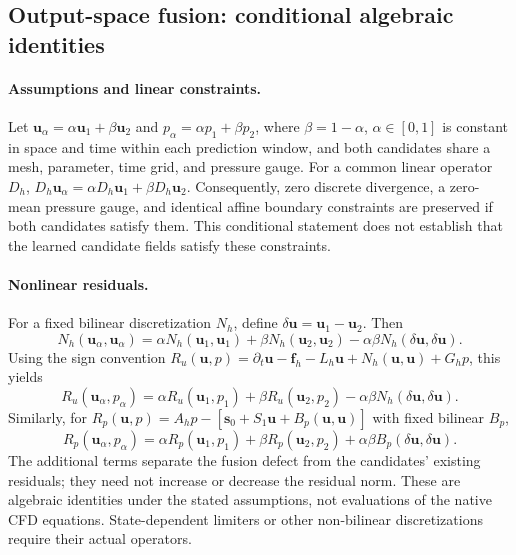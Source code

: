 
\subsection{Output-space fusion: conditional algebraic identities}
\label{app:fusion_consistency}

\paragraph{Assumptions and linear constraints.}
Let $\bm u_\alpha=\alpha\bm u_1+\beta\bm u_2$ and
$p_\alpha=\alpha p_1+\beta p_2$, where $\beta=1-\alpha$,
$\alpha\in[0,1]$ is constant in space and time within each prediction
window, and both candidates share a mesh, parameter, time grid, and
pressure gauge. For a common linear operator $D_h$,
$D_h\bm u_\alpha=\alpha D_h\bm u_1+\beta D_h\bm u_2$.
Consequently, zero discrete divergence, a zero-mean pressure gauge,
and identical affine boundary constraints are preserved if both
candidates satisfy them. This conditional statement does not establish
that the learned candidate fields satisfy these constraints.

\paragraph{Nonlinear residuals.}
For a fixed bilinear discretization $N_h$, define
$\delta\bm u=\bm u_1-\bm u_2$. Then
\begin{equation}
N_h(\bm u_\alpha,\bm u_\alpha)
=\alpha N_h(\bm u_1,\bm u_1)+\beta N_h(\bm u_2,\bm u_2)
-\alpha\beta N_h(\delta\bm u,\delta\bm u).
\end{equation}
Using the sign convention
$R_u(\bm u,p)=\partial_t\bm u-\bm f_h-L_h\bm u
+N_h(\bm u,\bm u)+G_hp$, this yields
\begin{equation}
R_u(\bm u_\alpha,p_\alpha)
=\alpha R_u(\bm u_1,p_1)+\beta R_u(\bm u_2,p_2)
-\alpha\beta N_h(\delta\bm u,\delta\bm u).
\end{equation}
Similarly, for
$R_p(\bm u,p)=A_hp-[\bm s_0+S_1\bm u+B_p(\bm u,\bm u)]$
with fixed bilinear $B_p$,
\begin{equation}
R_p(\bm u_\alpha,p_\alpha)
=\alpha R_p(\bm u_1,p_1)+\beta R_p(\bm u_2,p_2)
+\alpha\beta B_p(\delta\bm u,\delta\bm u).
\end{equation}
The additional terms separate the fusion defect from the candidates'
existing residuals; they need not increase or decrease the residual
norm. These are algebraic identities under the stated assumptions,
not evaluations of the native CFD equations. State-dependent limiters
or other non-bilinear discretizations require their actual operators.

